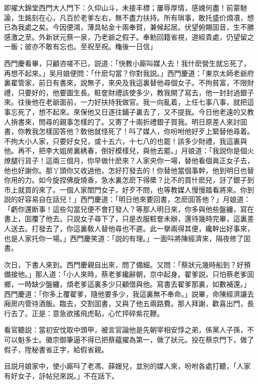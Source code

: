 即擢大錦堂西門大人門下：久仰山斗，未接丰標；屢辱厚情，感媿何盡！前蒙馳諭，生銘刻在心，凡百於老爹左右，無不盡力扶持。所有瑣事，敢托盛价煩凟，想已為我處之矣。今因便鴻，薄具帖金十兩奉賀，兼候起居。伏望俯賜囬音，生不勝感激之至。外新狀元蔡一泉，乃老爺之假子。奉勅回籍省視，道經貴處，仍望留之一飯；彼亦不敢有忘也。至祝至祝。龝後一日信」

西門慶看畢，只顧咨嗟不已，説道：「快教小廝叫媒人去！我什麽營生就忘死了，再想不起來。」吴月娘便問：「什麽勾當？你對我説。」西門慶道：「東京太師老爺府裏翟管家，前日有書來，説無子，來央及我這裏替他尋個女子。不拘貧富，不限財禮，只要好的，他要圖生長。粧奩財禮該使多少，教我開了寫去，他一封封過銀子來。往後他在老爺面前，一力好扶持我做官。我一向亂着，上任七事八事，就把這事忘死了，想不起來。來保他又日逐往鋪子裏去了，又不提我。今日他老遠的又教人捎書來，問尋的親事怎樣的了。又寄了十兩折禮銀子賀我。明日原差人來討囬書，你教我怎樣囬答他？敎他就怪死了！呌了媒人，你吩咐他好歹上緊替他尋着。不拘大小人家，只要好女兒，或十五六，十七八的也罷！該多少財禮，我這裏與他。再不，把李大姐房裏綉春，倒好模樣兒，與他去罷。」月娘道：「我説你是個火燎腿行貨子！這兩三個月，你早做什麽來？人家央你一場，替他看個眞正女子去，他也好謝你。那丫頭你又收過他，怎好打發去的！你替他當個事幹，他到明日也替你用的力。如今旋捏佛旋燒香，急水裏怎麽下得槳？比不的買什麽兒，㧱了銀子到市上就買的來了。一個人家閨門女子，好歹不問，也等教媒人慢慢踏看將來。你到説的好容易自在話兒！」西門慶道：「明日他來要回書，怎麽囬答他？」月娘道：「虧你還断事！這些勾當兒便不會打發人？等那人明日來，你多與他些盤纏，寫在書上，囬覆了他去。只説女子尋下了，只是衣服粧奩未辦，還待幾時完畢，這裏差人送去。打發去了，你這裏敎人替他尋也不遲。此一擧兩得其便，纔幹出好事來，也是人家托你一場。」西門慶笑道：「説的有理。」一面呌將陳經濟來，隔夜修了囬書。

次日，下書人來到。西門慶親自出來，問了備細。又問：「蔡狀元幾時船到？好預備接他。」那人道：「小人來時，蔡老爹纔辭朝，京中起身。翟爹説，只怕蔡老爹囬鄉，一時缺少盤纏，煩老爹這裏多少只顧借與他。寫書去翟爹那裏，如數補還。」西門慶道：「你多上覆翟爹，隨他要多少，我這裏無不奉命。」説畢，命陳經濟讓去廂房内管待酒飯。臨去，交割囬書，又與了他五兩路費。那人拜謝，歡喜出門，長行去了。正是：意急欲搖飛虎䩞，心忙抨碎紫花鞭。

看官聽説：當初安忱取中頭甲，被言官論他是先朝宰相安惇之弟，係黨人子孫，不可以魁多士。徽宗御筆逼不得已把蔡蘊擢為第一，做了狀元。投在蔡京門下，做了假子，陞秘書省正字，給假省親。

且説月娘家中，使小廝呌了老馮、薛嫂兒，並別的媒人來，吩咐各處打聽，「人家有好女子，㧱帖兒來説。」不在話下。

